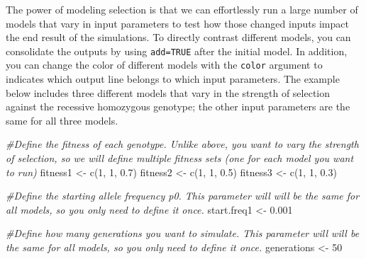 \documentclass[
]{book}
\newenvironment{Shaded}{\begin{snugshade}}{\end{snugshade}}
\newcommand{\CommentTok}[1]{\textcolor[rgb]{0.56,0.35,0.01}{\textit{#1}}}
\newcommand{\DecValTok}[1]{\textcolor[rgb]{0.00,0.00,0.81}{#1}}
\newcommand{\FloatTok}[1]{\textcolor[rgb]{0.00,0.00,0.81}{#1}}
\newcommand{\FunctionTok}[1]{\textcolor[rgb]{0.00,0.00,0.00}{#1}}
\newcommand{\NormalTok}[1]{#1}
\newcommand{\OtherTok}[1]{\textcolor[rgb]{0.56,0.35,0.01}{#1}}
\begin{document}
The power of modeling selection is that we can effortlessly run a large number of models that vary in input parameters to test how those changed inputs impact the end result of the simulations. To directly contrast different models, you can consolidate the outputs by using \texttt{add=TRUE} after the initial model. In addition, you can change the color of different models with the \texttt{color} argument to indicates which output line belongs to which input parameters. The example below includes three different models that vary in the strength of selection against the recessive homozygous genotype; the other input parameters are the same for all three models.

\begin{Shaded}
\begin{Highlighting}[]
\CommentTok{\#Define the fitness of each genotype. Unlike above, you want to vary the strength of selection, so we will define multiple fitness sets (one for each model you want to run)}
\NormalTok{fitness1 }\OtherTok{\textless{}{-}} \FunctionTok{c}\NormalTok{(}\DecValTok{1}\NormalTok{, }\DecValTok{1}\NormalTok{, }\FloatTok{0.7}\NormalTok{)}
\NormalTok{fitness2 }\OtherTok{\textless{}{-}} \FunctionTok{c}\NormalTok{(}\DecValTok{1}\NormalTok{, }\DecValTok{1}\NormalTok{, }\FloatTok{0.5}\NormalTok{)}
\NormalTok{fitness3 }\OtherTok{\textless{}{-}} \FunctionTok{c}\NormalTok{(}\DecValTok{1}\NormalTok{, }\DecValTok{1}\NormalTok{, }\FloatTok{0.3}\NormalTok{)}

\CommentTok{\#Define the starting allele frequency p0. This parameter will will be the same for all models, so you only need to define it once.}
\NormalTok{start.freq1 }\OtherTok{\textless{}{-}} \FloatTok{0.001}

\CommentTok{\#Define how many generations you want to simulate. This parameter will will be the same for all models, so you only need to define it once.}
\NormalTok{generations }\OtherTok{\textless{}{-}} \DecValTok{50}


\end{Highlighting}
\end{Shaded}
\end{document}
